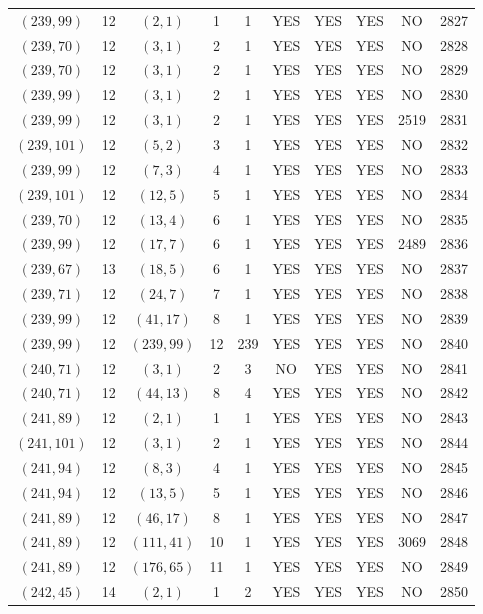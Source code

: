 \begin{longtable}{|c|c|c|c|c|c|c|c|c|c|}
$(239, 99)$ & 12 & $(2, 1)$ & 1 & 1 & YES & YES & YES & NO & 2827\\
$(239, 70)$ & 12 & $(3, 1)$ & 2 & 1 & YES & YES & YES & NO & 2828\\
$(239, 70)$ & 12 & $(3, 1)$ & 2 & 1 & YES & YES & YES & NO & 2829\\
$(239, 99)$ & 12 & $(3, 1)$ & 2 & 1 & YES & YES & YES & NO & 2830\\
$(239, 99)$ & 12 & $(3, 1)$ & 2 & 1 & YES & YES & YES & 2519 & 2831\\
$(239, 101)$ & 12 & $(5, 2)$ & 3 & 1 & YES & YES & YES & NO & 2832\\
$(239, 99)$ & 12 & $(7, 3)$ & 4 & 1 & YES & YES & YES & NO & 2833\\
$(239, 101)$ & 12 & $(12, 5)$ & 5 & 1 & YES & YES & YES & NO & 2834\\
$(239, 70)$ & 12 & $(13, 4)$ & 6 & 1 & YES & YES & YES & NO & 2835\\
$(239, 99)$ & 12 & $(17, 7)$ & 6 & 1 & YES & YES & YES & 2489 & 2836\\
$(239, 67)$ & 13 & $(18, 5)$ & 6 & 1 & YES & YES & YES & NO & 2837\\
$(239, 71)$ & 12 & $(24, 7)$ & 7 & 1 & YES & YES & YES & NO & 2838\\
$(239, 99)$ & 12 & $(41, 17)$ & 8 & 1 & YES & YES & YES & NO & 2839\\
$(239, 99)$ & 12 & $(239, 99)$ & 12 & 239 & YES & YES & YES & NO & 2840\\
$(240, 71)$ & 12 & $(3, 1)$ & 2 & 3 & NO & YES & YES & NO & 2841\\
$(240, 71)$ & 12 & $(44, 13)$ & 8 & 4 & YES & YES & YES & NO & 2842\\
$(241, 89)$ & 12 & $(2, 1)$ & 1 & 1 & YES & YES & YES & NO & 2843\\
$(241, 101)$ & 12 & $(3, 1)$ & 2 & 1 & YES & YES & YES & NO & 2844\\
$(241, 94)$ & 12 & $(8, 3)$ & 4 & 1 & YES & YES & YES & NO & 2845\\
$(241, 94)$ & 12 & $(13, 5)$ & 5 & 1 & YES & YES & YES & NO & 2846\\
$(241, 89)$ & 12 & $(46, 17)$ & 8 & 1 & YES & YES & YES & NO & 2847\\
$(241, 89)$ & 12 & $(111, 41)$ & 10 & 1 & YES & YES & YES & 3069 & 2848\\
$(241, 89)$ & 12 & $(176, 65)$ & 11 & 1 & YES & YES & YES & NO & 2849\\
$(242, 45)$ & 14 & $(2, 1)$ & 1 & 2 & YES & YES & YES & NO & 2850\\

\end{longtable}
